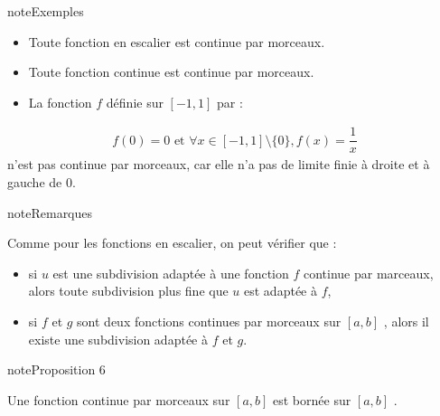 \documentclass[letterpaper,10pt,french]{sphinxmanual}
\begin{document}
\begin{sphinxadmonition}{note}{Exemples}
\begin{itemize}
\item {} 
\sphinxAtStartPar
Toute fonction en escalier est continue par morceaux.

\item {} 
\sphinxAtStartPar
Toute fonction continue est continue par morceaux.

\item {} 
\sphinxAtStartPar
La fonction \(f\) définie sur \([-1, 1]\) par :

\end{itemize}
\begin{equation*}
\begin{split}f(0)=0 \mbox{  et  } \forall x \in [-1, 1] \setminus \{0\}, f(x)=\dfrac{1}{x}
\end{split}
\end{equation*}
\sphinxAtStartPar
n’est pas continue par morceaux, car elle n’a pas de limite finie à droite et à gauche de \(0\).
\end{sphinxadmonition}

\begin{sphinxadmonition}{note}{Remarques}

\sphinxAtStartPar
Comme pour les fonctions en escalier, on peut vérifier que :
\begin{itemize}
\item {} 
\sphinxAtStartPar
si \(u\) est une subdivision adaptée à une fonction \(f\) continue par marceaux,
alors toute subdivision plus fine que \(u\) est adaptée à \(f\),

\item {} 
\sphinxAtStartPar
si \(f\) et \(g\) sont deux fonctions continues par morceaux sur \([a, b]\) , alors il existe
une subdivision adaptée à \(f\) et \(g\).

\end{itemize}
\end{sphinxadmonition}

\begin{sphinxadmonition}{note}{Proposition 6}

\sphinxAtStartPar
Une fonction continue par morceaux sur  \([a, b]\) est bornée sur \([a, b]\) .
\end{sphinxadmonition}
\end{document}
